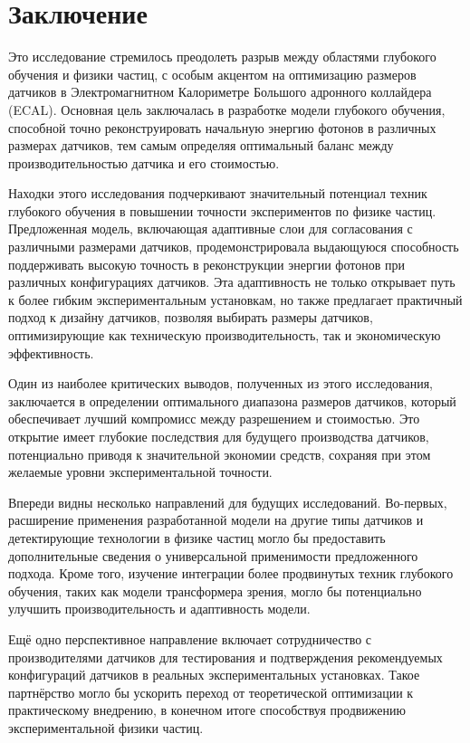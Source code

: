 \documentclass[a4paper,12pt]{extarticle}
\begin{document}
\section{Заключение}
\label{conclusion}

Это исследование стремилось преодолеть разрыв между областями глубокого обучения и физики частиц, с особым акцентом на оптимизацию размеров датчиков в Электромагнитном Калориметре Большого адронного коллайдера (ECAL). Основная цель заключалась в разработке модели глубокого обучения, способной точно реконструировать начальную энергию фотонов в различных размерах датчиков, тем самым определяя оптимальный баланс между производительностью датчика и его стоимостью.

Находки этого исследования подчеркивают значительный потенциал техник глубокого обучения в повышении точности экспериментов по физике частиц. Предложенная модель, включающая адаптивные слои для согласования с различными размерами датчиков, продемонстрировала выдающуюся способность поддерживать высокую точность в реконструкции энергии фотонов при различных конфигурациях датчиков. Эта адаптивность не только открывает путь к более гибким экспериментальным установкам, но также предлагает практичный подход к дизайну датчиков, позволяя выбирать размеры датчиков, оптимизирующие как техническую производительность, так и экономическую эффективность.

Один из наиболее критических выводов, полученных из этого исследования, заключается в определении оптимального диапазона размеров датчиков, который обеспечивает лучший компромисс между разрешением и стоимостью. Это открытие имеет глубокие последствия для будущего производства датчиков, потенциально приводя к значительной экономии средств, сохраняя при этом желаемые уровни экспериментальной точности.

Впереди видны несколько направлений для будущих исследований. Во-первых, расширение применения разработанной модели на другие типы датчиков и детектирующие технологии в физике частиц могло бы предоставить дополнительные сведения о универсальной применимости предложенного подхода. Кроме того, изучение интеграции более продвинутых техник глубокого обучения, таких как модели трансформера зрения, могло бы потенциально улучшить производительность и адаптивность модели.

Ещё одно перспективное направление включает сотрудничество с производителями датчиков для тестирования и подтверждения рекомендуемых конфигураций датчиков в реальных экспериментальных установках. Такое партнёрство могло бы ускорить переход от теоретической оптимизации к практическому внедрению, в конечном итоге способствуя продвижению экспериментальной физики частиц.
\end{document}

